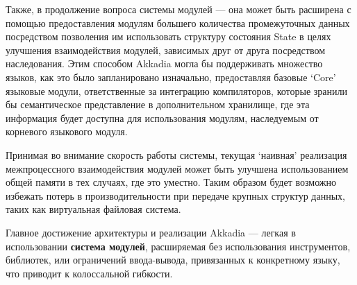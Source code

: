 Также, в продолжение вопроса системы модулей --- она может быть расширена с помощью предоставления модулям большего количества промежуточных данных посредством позволения им использовать структуру состояния State в целях улучшения взаимодействия модулей, зависимых друг от друга посредством наследования. Этим способом Akkadia могла бы поддерживать множество языков, как это было запланировано изначально, предоставляя базовые `Core' языковые модули, ответственные за интеграцию компиляторов, которые зранили бы семантическое представление в дополнительном хранилище, где эта информация будет доступна для использования модулям, наследуемым от корневого языкового модуля.

Принимая во внимание скорость работы системы, текущая `наивная' реализация межпроцессного взаимодействия модулей может быть улучшена использованием общей памяти в тех случаях, где это уместно. Таким образом будет возможно избежать потерь в производительности при передаче крупных структур данных, таких как виртуальная файловая система.

Главное достижение архитектуры и реализации Akkadia --- легкая в использовании \textbf{система модулей}, расширяемая без использования инструментов, библиотек, или ограничений ввода-вывода, привязанных к конкретному языку, что приводит к колоссальной гибкости.
